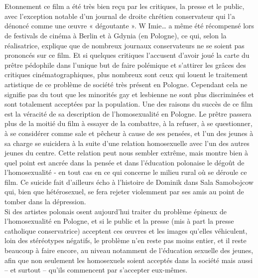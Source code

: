 \documentclass[12pt]{amsart}
\begin{document}
\\ \\
Etonnement ce film a été très bien reçu par les critiques, la presse et le public, avec l’exception notable d’un journal de droite chrétien conservateur qui l’a dénoncé comme une œuvre « dégoutante ». W Imie… a même été récompensé lors de festivals de cinéma à Berlin et à Gdynia (en Pologne), ce qui, selon la réalisatrice, explique que de nombreux journaux conservateurs ne se soient pas prononcés sur ce film. Et si quelques critiques l’accusent d’avoir joué la carte du prêtre pédophile dans l’unique but de faire polémique et s’attirer les grâces des critiques cinématographiques, plus nombreux sont ceux qui louent le traitement artistique de ce problème de société très présent en Pologne. Cependant cela ne signifie pas du tout que les minorités gay et lesbienne ne sont plus discriminées et sont totalement acceptées par la population. Une des raisons du succès de ce film est la véracité de sa description de l’homosexualité en Pologne. Le prêtre passera plus de la moitié du film à essayer de la combattre, à la refuser, à se questionner, à se considérer comme sale et pêcheur à cause de ses pensées, et l’un des jeunes à sa charge se suicidera à la suite d’une relation homosexuelle avec l’un des autres jeunes du centre. Cette relation peut nous sembler extrême, mais montre bien à quel point est ancrée dans la pensée et dans l’éducation polonaise le dégoût de l’homosexualité - en tout cas en ce qui concerne le milieu rural où se déroule ce film. Ce suicide fait d’ailleurs écho à l’histoire de Dominik dans Sala Samobojcow qui, bien que hétérosexuel, se fera rejeter violemment par ses amis au point de tomber dans la dépression. \\
Si des artistes polonais osent aujourd’hui traiter du problème épineux de l’homosexualité en Pologne, et si le public et la presse (mis à part la presse catholique conservatrice) acceptent ces œuvres et les images qu’elles véhiculent, loin des stéréotypes négatifs, le problème n’en reste pas moins entier, et il reste beaucoup à faire encore, au niveau notamment de l’éducation sexuelle des jeunes, afin que non seulement les homosexuels soient acceptés dans la société mais aussi – et surtout – qu’ils commencent par s’accepter eux-mêmes.
\clearpage
\end{document}
